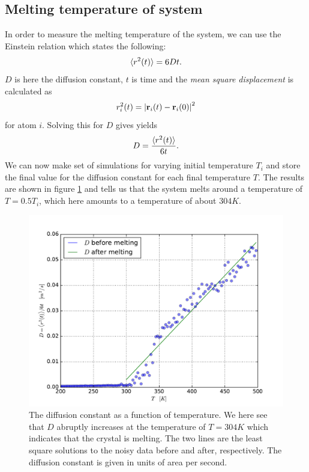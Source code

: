 \documentclass[a4paper]{article}
\renewcommand{\vec}[1]{\mathbf{#1}}
\begin{document}
\subsection{Melting temperature of system}
\label{sub:melting_temperature_of_system}

    In order to measure the melting temperature of the system, we can use the
    Einstein relation which states the following:
    \begin{equation}
        \notag
        \langle r^2(t) \rangle = 6Dt.
    \end{equation}
    $D$ is here the diffusion constant, $t$ is time and the \emph{mean square
    displacement} is calculated as
    \begin{equation}
        \notag
        r_i^2(t) = \left| \vec{r}_i(t) - \vec{r}_i(0) \right|^2
    \end{equation}
    for atom $i$. Solving this for $D$ gives yields
    \begin{equation}
        \notag
        D = \frac{\langle r^2(t) \rangle}{6t}.
    \end{equation}
    We can now make set of simulations for varying initial temperature $T_i$
    and store the final value for the diffusion constant for each final
    temperature $T$. The results are shown in figure
    \ref{fig:diffusion_constant} and tells us that the system melts around a
    temperature of $T = 0.5T_i$, which here amounts to a temperature of about
    $304K$.
    
    \begin{figure}[h]
        \centering
        \includegraphics[width=0.8\linewidth]{diffusion_constant.pdf}
        \caption[Diffusion constant]{The diffusion constant as a function of temperature. We here
                see that $D$ abruptly increases at the temperature of $T = 304K$
                which indicates that the crystal is melting.  The two lines are the
                least square solutions to the noisy data before and after,
                respectively. The diffusion constant is given in units of area per second.}
        \label{fig:diffusion_constant}
    \end{figure}
\clearpage
\end{document}
